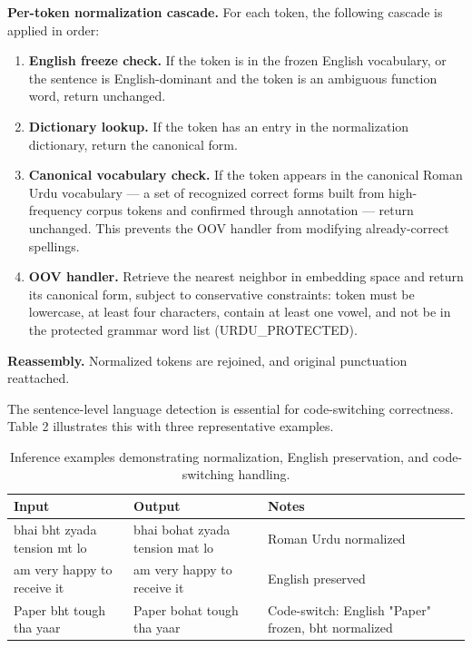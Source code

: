 \documentclass[11pt]{article}
\begin{document}
\textbf{Per-token normalization cascade.} For each token, the following cascade is applied in order:
\vspace{-0.3em}
\begin{enumerate}
\setlength{\itemsep}{2pt}
\setlength{\parsep}{0pt}
\setlength{\parskip}{0pt}
\setlength{\topsep}{2pt}
    \item \textbf{English freeze check.} If the token is in the frozen English vocabulary, or the sentence is English-dominant and the token is an ambiguous function word, return unchanged.
    \item \textbf{Dictionary lookup.} If the token has an entry in the normalization dictionary, return the canonical form.
    \item \textbf{Canonical vocabulary check.} If the token appears in the canonical Roman Urdu vocabulary — a set of recognized correct forms built from high-frequency corpus tokens and confirmed through annotation — return unchanged. This prevents the OOV handler from modifying already-correct spellings.
    \item \textbf{OOV handler.} Retrieve the nearest neighbor in embedding space and return its canonical form, subject to conservative constraints: token must be lowercase, at least four characters, contain at least one vowel, and not be in the protected grammar word list (URDU\_PROTECTED).
\end{enumerate}
\vspace{-0.3em}
\textbf{Reassembly.} Normalized tokens are rejoined, and original punctuation reattached.

The sentence-level language detection is essential for code-switching correctness. Table 2 illustrates this with three representative examples.


\begin{table}[h]
\centering
\small
\begin{tabular}{p{1.8cm}p{2.8cm}p{2.2cm}}
\toprule
\textbf{Input} & \textbf{Output} & \textbf{Notes} \\
\midrule
bhai bht zyada tension mt lo & bhai bohat zyada tension mat lo & Roman Urdu normalized \\
\midrule
am very happy to receive it & am very happy to receive it & English preserved \\
\midrule
Paper bht tough tha yaar & Paper bohat tough tha yaar & Code-switch: English "Paper" frozen, bht normalized \\
\bottomrule
\end{tabular}
\caption{Inference examples demonstrating normalization, English preservation, and code-switching handling.}
\label{tab:examples}
\end{table}
\end{document}
